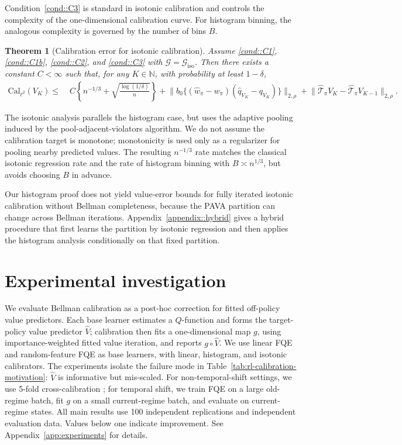 \documentclass{article}
\theoremstyle{plain}
\newtheorem{theorem}{Theorem}
\theoremstyle{definition}
\theoremstyle{remark}
\begin{document}
Condition~\ref{cond::C3} is standard in isotonic calibration
\citep{van2023causal} and controls the complexity of the one-dimensional
calibration curve. For histogram binning, the analogous complexity is governed
by the number of bins \(B\).

\begin{theorem}[Calibration error for isotonic calibration]
\label{theorem::Calerroriso}
Assume \ref{cond::C1}, \ref{cond::C1b}, \ref{cond::C2}, and \ref{cond::C3}
with \(\mathcal G=\mathcal G_{\mathrm{iso}}\). Then there exists a constant
\(C<\infty\) such that, for any \(K\in\mathbb N\), with probability at least
\(1-\delta\),
{\small
\begin{align*}
\mathrm{Cal}_{\ell^2}(V_K)
\le\;&
C\left\{
n^{-1/3}
+
\sqrt{\frac{\log(1/\delta)}{n}}
\right\}  +
\big\|
b_0\{
(\widehat w_\pi-w_\pi)
(\widehat q_{V_K}-q_{V_K})
\}
\big\|_{2,\rho}  +
\big\|
\widehat{\mathcal T}_\pi V_K
-
\widehat{\mathcal T}_\pi V_{K-1}
\big\|_{2,\rho}.
\end{align*}
}
\end{theorem}
 
The isotonic analysis parallels the histogram case, but uses the adaptive
pooling induced by the pool-adjacent-violators algorithm. We do not assume the
calibration target is monotone; monotonicity is used only as a regularizer for
pooling nearby predicted values. The resulting \(n^{-1/3}\) rate matches the
classical isotonic regression rate \citep{chatterjee2013improved} and the rate
of histogram binning with \(B\asymp n^{1/3}\), but avoids choosing \(B\) in
advance.

 
Our histogram proof does not yield value-error bounds for fully iterated
isotonic calibration without Bellman completeness, because the PAVA partition can
change across Bellman iterations. Appendix~\ref{appendix::hybrid} gives a hybrid
procedure that first learns the partition by isotonic regression and then
applies the histogram analysis conditionally on that fixed partition.

\section{Experimental investigation}
\label{sec:experiments}

We evaluate Bellman calibration as a post-hoc correction for fitted off-policy
value predictors. Each base learner estimates a \(Q\)-function and forms the
target-policy value predictor \(\widehat V\); calibration then fits a
one-dimensional map \(g\), using importance-weighted fitted value iteration, and
reports \(g\circ \widehat V\). We use linear FQE and random-feature FQE as base
learners, with linear, histogram, and isotonic calibrators. The experiments
isolate the failure mode in Table~\ref{tab:rl-calibration-motivation}:
\(\widehat V\) is informative but mis-scaled. For non-temporal-shift settings,
we use 5-fold cross-calibration \citep{van2023causal}; for temporal shift, we
train FQE on a large old-regime batch, fit \(g\) on a small current-regime
batch, and evaluate on current-regime states. All main results use 100
independent replications and independent evaluation data. Values below one
indicate improvement. See Appendix~\ref{app:experiments} for details.
\end{document}
